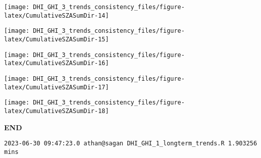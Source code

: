 \documentclass[
  10pt,
  a4paper,oneside]{article}
\begin{document}
\begin{center}\texttt{[image: DHI\_GHI\_3\_trends\_consistency\_files/figure-latex/CumulativeSZASumDir-14]} \end{center}

\begin{center}\texttt{[image: DHI\_GHI\_3\_trends\_consistency\_files/figure-latex/CumulativeSZASumDir-15]} \end{center}

\begin{center}\texttt{[image: DHI\_GHI\_3\_trends\_consistency\_files/figure-latex/CumulativeSZASumDir-16]} \end{center}

\begin{center}\texttt{[image: DHI\_GHI\_3\_trends\_consistency\_files/figure-latex/CumulativeSZASumDir-17]} \end{center}

\begin{center}\texttt{[image: DHI\_GHI\_3\_trends\_consistency\_files/figure-latex/CumulativeSZASumDir-18]} \end{center}

\textbf{END}

\begin{verbatim}
2023-06-30 09:47:23.0 athan@sagan DHI_GHI_1_longterm_trends.R 1.903256 mins
\end{verbatim}
\end{document}
